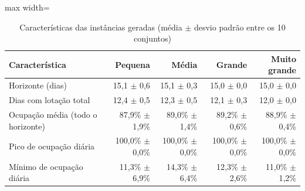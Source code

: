 \begin{table}[htbp]
    \caption{Características das instâncias geradas (média $\pm$ desvio padrão entre os 10 conjuntos)}
    \label{tab:caracteristicas-instancias}
    \centering
    \begin{adjustbox}{max width=\textwidth}
    \begin{tabular}{lrrrr}
        \hline
        \textbf{Característica} & \textbf{Pequena} & \textbf{Média} & \textbf{Grande} & \textbf{Muito grande} \\
        \hline
        Horizonte (dias) & 15,1 $\pm$ 0,6 & 15,1 $\pm$ 0,3 & 15,0 $\pm$ 0,0 & 15,0 $\pm$ 0,0 \\
        Dias com lotação total & 12,4 $\pm$ 0,5 & 12,3 $\pm$ 0,5 & 12,1 $\pm$ 0,3 & 12,0 $\pm$ 0,0 \\
        Ocupação média (todo o horizonte) & 87,9\% $\pm$ 1,9\% & 89,0\% $\pm$ 1,4\% & 89,2\% $\pm$ 0,6\% & 88,9\% $\pm$ 0,4\% \\
        Pico de ocupação diária & 100,0\% $\pm$ 0,0\% & 100,0\% $\pm$ 0,0\% & 100,0\% $\pm$ 0,0\% & 100,0\% $\pm$ 0,0\% \\
        Mínimo de ocupação diária & 11,3\% $\pm$ 6,9\% & 14,3\% $\pm$ 6,4\% & 12,3\% $\pm$ 2,6\% & 11,0\% $\pm$ 1,2\% \\
        \hline
    \end{tabular}
    \end{adjustbox}
\end{table}
